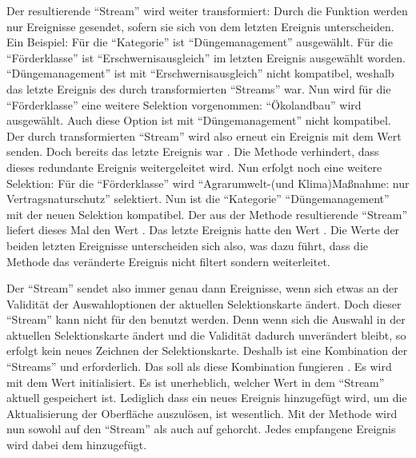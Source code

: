 Der resultierende \enquote{Stream} wird weiter transformiert: Durch die Funktion   werden nur Ereignisse gesendet,
sofern sie sich von dem letzten Ereignis unterscheiden.
Ein Beispiel: Für die \enquote{Kategorie} ist \enquote{Düngemanagement} ausgewählt.
Für die \enquote{Förderklasse} ist \enquote{Erschwernisausgleich} im letzten Ereignis ausgewählt worden.
\enquote{Düngemanagement} ist mit \enquote{Erschwernisausgleich} nicht kompatibel, weshalb das letzte Ereignis des durch  transformierten \enquote{Streams}  war.
Nun wird für die \enquote{Förderklasse} eine weitere Selektion vorgenommen: \enquote{Ökolandbau} wird ausgewählt.
Auch diese Option ist mit \enquote{Düngemanagement} nicht kompatibel.
Der durch  transformierten \enquote{Stream} wird also erneut ein Ereignis mit dem Wert  senden.
Doch bereits das letzte Ereignis war .
Die Methode  verhindert,
dass dieses redundante Ereignis weitergeleitet wird.
Nun erfolgt noch eine weitere Selektion: Für die \enquote{Förderklasse} wird \enquote{Agrarumwelt-(und Klima)Maßnahme: nur Vertragsnaturschutz} selektiert.
Nun ist die \enquote{Kategorie} \enquote{Düngemanagement} mit der neuen Selektion kompatibel.
Der aus der Methode  resultierende \enquote{Stream} liefert dieses Mal den Wert .
Das letzte Ereignis hatte den Wert .
Die Werte der beiden letzten Ereignisse unterscheiden sich also,
was dazu führt,
dass die Methode  das veränderte Ereignis nicht filtert sondern weiterleitet.

Der \enquote{Stream}  sendet also immer genau dann Ereignisse,
wenn sich etwas an der Validität der Auswahloptionen der aktuellen Selektionskarte ändert.
Doch dieser \enquote{Stream} kann nicht für den  benutzt werden.
Denn wenn sich die Auswahl in der aktuellen Selektionskarte ändert
und die Validität dadurch unverändert bleibt,
so erfolgt kein neues Zeichnen der Selektionskarte.
Deshalb ist eine Kombination der \enquote{Streams}  und  erforderlich.
Das   soll als diese Kombination fungieren .
Es wird mit dem Wert  initialisiert.
Es ist unerheblich, welcher Wert in dem \enquote{Stream} aktuell gespeichert ist.
Lediglich dass ein neues Ereignis hinzugefügt wird,
um die Aktualisierung der Oberfläche auszulösen,
ist wesentlich.
Mit der Methode  wird nun sowohl auf den \enquote{Stream}   als auch auf   gehorcht. 
Jedes empfangene Ereignis wird dabei dem   hinzugefügt.

